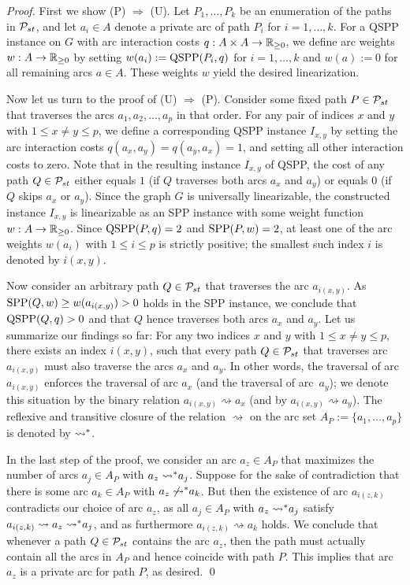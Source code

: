 \documentclass[runningheads]{llncs}
\begin{document}
\begin{proof}
First we show (P) $\Rightarrow$ (U).
Let $P_1,\ldots,P_k$ be an enumeration of the paths in ${\cal P}_{st}$, and
let $a_i\in A$ denote a private arc of path $P_i$ for $i=1,\ldots,k$.
For a QSPP instance on $G$ with arc interaction costs $q:A\times A\to{\mathbb{R}_{\ge0}}$, we define 
arc weights $w:A\to{\mathbb{R}_{\ge0}}$ by setting $w(a_i):=\text{QSPP}(P_i,q)$ for $i=1,\ldots,k$ and 
$w(a):=0$ for all remaining arcs $a\in A$.
These weights $w$ yield the desired linearization.

Now let us turn to the proof of (U) $\Rightarrow$ (P).
Consider some fixed path $P\in{\cal P}_{st}$ that traverses the arcs $a_1,a_2,\ldots,a_p$ in that order.
For any pair of indices $x$ and $y$ with $1\le x\ne y\le p$, we define a corresponding QSPP instance
$I_{x,y}$ by setting the arc interaction costs $q(a_x,a_y)=q(a_y,a_x)=1$, and setting all other 
interaction costs to zero.
Note that in the resulting instance $I_{x,y}$ of QSPP, the cost of any path $Q\in{\cal P}_{st}$ 
either equals $1$ (if $Q$ traverses both arcs $a_x$ and $a_y$) or equals $0$ (if $Q$ skips 
$a_x$ or $a_y$).
Since the graph $G$ is universally linearizable, the constructed instance $I_{x,y}$ is linearizable
as an SPP instance with some weight function $w:A\to{\mathbb{R}_{\ge0}}$.
Since $\text{QSPP}(P,q)=2$ and $\text{SPP}(P,w)=2$, at least one of the arc weights $w(a_i)$ with 
$1\le i\le p$ is strictly positive; the smallest such index $i$ is denoted by $i(x,y)$.

Now consider an arbitrary path $Q\in{\cal P}_{st}$ that traverses the arc $a_{i(x,y)}$.
As $\text{SPP}(Q,w)\ge w(a_{i(x,y)})>0$ holds in the SPP instance, we conclude that $\text{QSPP}(Q,q)>0$ and 
that $Q$ hence traverses both arcs $a_x$ and $a_y$.
Let us summarize our findings so far:
For any two indices $x$ and $y$ with $1\le x\ne y\le p$, there exists an index $i(x,y)$,
such that every path $Q\in{\cal P}_{st}$ that traverses arc $a_{i(x,y)}$ must also traverse the 
arcs $a_x$ and $a_y$.
In other words, the traversal of arc $a_{i(x,y)}$ enforces the traversal of arc $a_x$ 
(and the traversal of arc~$a_y$); we denote this situation by the binary relation 
$a_{i(x,y)}\rightsquigarrow a_x$ (and by $a_{i(x,y)}\rightsquigarrow a_y$).
The reflexive and transitive closure of the relation $\rightsquigarrow$ on the 
arc set $A_P:=\{a_1,\ldots,a_p\}$ is denoted by $\rightsquigarrow\negthickspace^*$.

In the last step of the proof, we consider an arc $a_z\in A_P$ that maximizes the number 
of arcs $a_j\in A_P$ with $a_z\rightsquigarrow\negthickspace^* a_j$.
Suppose for the sake of contradiction that there is some arc $a_k\in A_P$ 
with $a_z\not\rightsquigarrow\negthickspace^* a_k$.
But then the existence of arc $a_{i(z,k)}$ contradicts our choice of arc $a_z$, 
as all $a_j\in A_P$ with $a_z\rightsquigarrow\negthickspace^* a_j$ 
satisfy $a_{i(z,k)}\rightsquigarrow a_z\rightsquigarrow\negthickspace^* a_j$,
and as furthermore $a_{i(z,k)}\rightsquigarrow a_k$ holds.
We conclude that whenever a path $Q\in{\cal P}_{st}$ contains the arc $a_z$, then the path
must actually contain all the arcs in $A_P$ and hence coincide with path $P$.
This implies that arc $a_z$ is a private arc for path $P$, as desired.
\qed
\end{proof}
\end{document}
